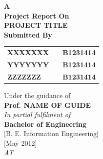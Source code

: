 
\newpage


\begin{center}
\thispagestyle{empty}


\Large{\textbf{A\\Project Report On}}\\[0.7cm]
\Large{\textsc {\textbf{PROJECT TITLE}}}\\[0.5cm]
\Large{\textbf{Submitted By}}\\[0.5cm]
\begin{table}[h]
\centering
\begin{tabular}{>{\bfseries}lc>{\bfseries}r}
XXXXXXX & & B1231414\\ %
YYYYYYY & & B1231414\\ %
ZZZZZZZ & & B1231414\\ %
\end{tabular}
\end{table}
\large{Under the guidance of}\\[0.5cm]
\Large{\textbf{Prof. NAME OF GUIDE}}\\[0.4cm]
\large{\emph{In partial fulfilment of}}\\
\LARGE{\textbf{Bachelor of Engineering}}\\
\LARGE{{[}B. E. Information Engineering{]}}\\[0.5cm]
\LARGE{{[}May 2012{]}}\\
\Large{\emph{AT}}\\[0.2cm]




\end{center}

